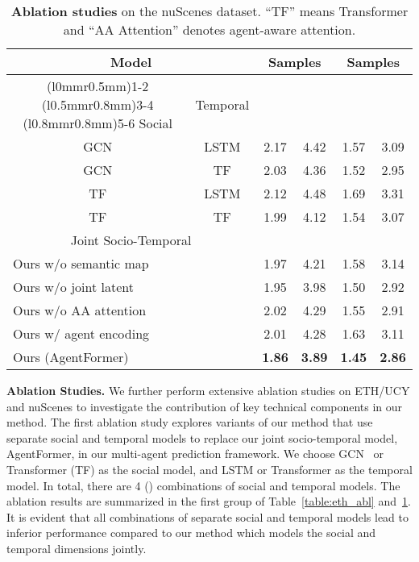 \documentclass[10pt,twocolumn,letterpaper]{article}
\newcommand{\mname}{AgentFormer}
\begin{document}
\begin{table}[t]
\footnotesize
\centering
\begin{tabular}{@{\hskip 1mm}cc|cccc}
\toprule
\multicolumn{2}{c|}{Model} & \multicolumn{2}{c}{ Samples} & \multicolumn{2}{c}{ Samples}\\
\cmidrule(l{0mm}r{0.5mm}){1-2}
\cmidrule(l{0.5mm}r{0.8mm}){3-4}
\cmidrule(l{0.8mm}r{0.8mm}){5-6}
 \hspace{1.5mm} Social \hspace{1.5mm} & Temporal &  &  &  & \\ \midrule GCN & LSTM & 2.17 & 4.42 & 1.57 & 3.09 \\
GCN & TF & 2.03 & 4.36 & 1.52 & 2.95 \\
TF & LSTM & 2.12 & 4.48 & 1.69 & 3.31 \\
TF & TF & 1.99 & 4.12 & 1.54 & 3.07 \\
\midrule
\multicolumn{2}{c|}{Joint Socio-Temporal} &   &  &  & \\ \midrule \multicolumn{2}{l|}{Ours w/o semantic map}  & 1.97 & 4.21 & 1.58 & 3.14 \\
\multicolumn{2}{l|}{Ours w/o joint latent}  & 1.95 & 3.98 & 1.50 & 2.92 \\
\multicolumn{2}{l|}{Ours w/o AA attention} & 2.02 & 4.29 & 1.55 & 2.91 \\
\multicolumn{2}{l|}{Ours w/ agent encoding} & 2.01 & 4.28 & 1.63 & 3.11 \\
\multicolumn{2}{l|}{Ours (\mname)} & \textbf{1.86} & \textbf{3.89} & \textbf{1.45} & \textbf{2.86}\\
\bottomrule
\end{tabular}
\vspace{1.5mm}
\caption{\textbf{Ablation studies} on the nuScenes dataset. ``TF'' means Transformer and ``AA Attention'' denotes agent-aware attention.}
\label{table:nuscenes_abl}
\vspace{-3mm}
\end{table} 
\vspace{2mm}
\noindent\textbf{Ablation Studies.}
We further perform extensive ablation studies on ETH/UCY and nuScenes to investigate the contribution of key technical components in our method. The first ablation study explores variants of our method that use separate social and temporal models to replace our joint socio-temporal model, \mname, in our multi-agent prediction framework. We choose GCN~\cite{kipf2016semi} or Transformer (TF) as the social model, and LSTM or Transformer as the temporal model. In total, there are 4 () combinations of social and temporal models. The ablation results are summarized in the first group of Table~\ref{table:eth_abl} and~\ref{table:nuscenes_abl}. It is evident that all combinations of separate social and temporal models lead to inferior performance compared to our method which models the social and temporal dimensions jointly. 
\end{document}
